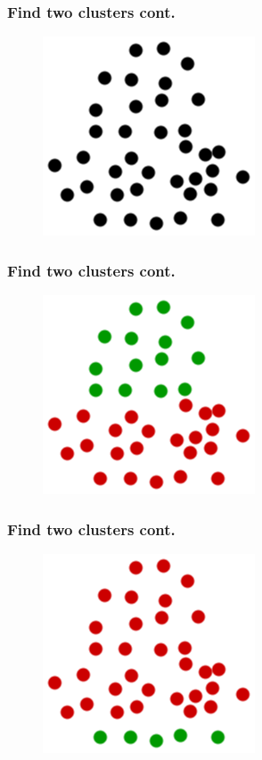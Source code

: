 \documentclass{beamer}
\begin{document}
  \begin{frame}
    \frametitle{Find two clusters cont.} 
    \begin{figure}
      \includegraphics[scale=.5]{graphics/presentation/clusters2} 
    \end{figure}
  \end{frame}

  \begin{frame}
    \frametitle{Find two clusters cont.} 
    \begin{figure}
      \includegraphics[scale=.5]{graphics/presentation/clusters2a} 
    \end{figure}
  \end{frame}

  \begin{frame}
    \frametitle{Find two clusters cont.} 
    \begin{figure}
      \includegraphics[scale=.5]{graphics/presentation/clusters2b} 
    \end{figure}
  \end{frame}
\end{document}

